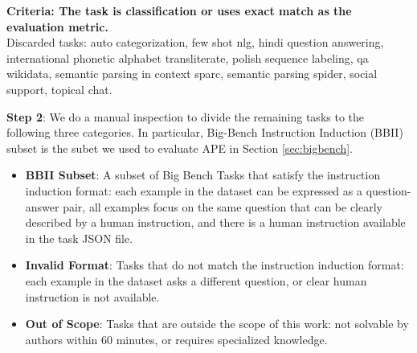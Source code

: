 \textbf{Criteria: The task is classification or uses exact match as the evaluation metric.}\\
Discarded tasks: auto categorization, few shot nlg, hindi question answering, international phonetic alphabet transliterate, polish sequence labeling, qa wikidata, semantic parsing in context sparc, semantic parsing spider, social support, topical chat.

\clearpage
\newpage
\textbf{Step 2}: We do a manual inspection to divide the remaining tasks to the following three categories. In particular, Big-Bench Instruction Induction (BBII) subset is the subet we used to evaluate APE in Section \ref{sec:bigbench}.

\begin{itemize}
    \item \textbf{BBII Subset}: A subset of Big Bench Tasks that satisfy the instruction induction format: each example in the dataset can be expressed as a question-answer pair, all examples focus on the same question that can be clearly described by a human instruction, and there is a human instruction available in the task JSON file.
    \item \textbf{Invalid Format}: Tasks that do not match the instruction induction format: each example in the dataset asks a different question, or clear human instruction is not available. 
    \item \textbf{Out of Scope}: Tasks that are outside the scope of this work: not solvable by authors within 60 minutes, or requires specialized knowledge. 
\end{itemize}

